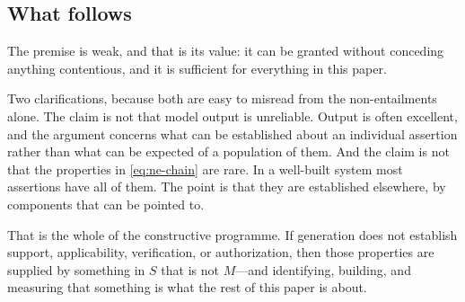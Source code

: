 \subsection{What follows}

The premise is weak, and that is its value: it can be granted without conceding
anything contentious, and it is sufficient for everything in this paper.

Two clarifications, because both are easy to misread from the non-entailments
alone. The claim is not that model output is unreliable. Output is often excellent,
and the argument concerns what can be established about an individual assertion
rather than what can be expected of a population of them. And the claim is not that
the properties in \eqref{eq:ne-chain} are rare. In a well-built system most
assertions have all of them. The point is that they are established elsewhere, by
components that can be pointed to.

That is the whole of the constructive programme. If generation does not establish
support, applicability, verification, or authorization, then those properties are
supplied by something in $S$ that is not $M$---and identifying, building, and
measuring that something is what the rest of this paper is about.
